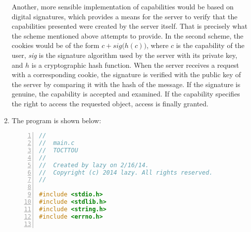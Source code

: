 \begin{enumerate}
Another, more sensible implementation of capabilities would be based on digital signatures, which provides a means for the server to verify that the capabilities presented were created by the server itself. That is precisely what the scheme mentioned above attempts to provide. In the second scheme, the cookies would be of the form $c + \textit{sig}\big(h(c)\big)$, where $c$ is the capability of the user, \textit{sig} is the signature algorithm used by the server with its private key, and $h$ is a cryptographic hash function. When the server receives a request with a corresponding cookie, the signature is verified with the public key of the server by comparing it with the hash of the message. If the signature is genuine, the capability is accepted and examined. If the capability specifies the right to access the requested object, access is finally granted.
\item %
The program is shown below:
\begin{lstlisting}[language=C,numbers=left,numberstyle=\tiny,columns=fullflexible,basicstyle=\footnotesize\ttfamily, breaklines=true, breakautoindent=true, breakindent=4em]
//
//  main.c
//  TOCTTOU
//
//  Created by lazy on 2/16/14.
//  Copyright (c) 2014 lazy. All rights reserved.
//

#include <stdio.h> 
#include <stdlib.h>
#include <string.h>
#include <errno.h>


\end{lstlisting}
\end{enumerate}
